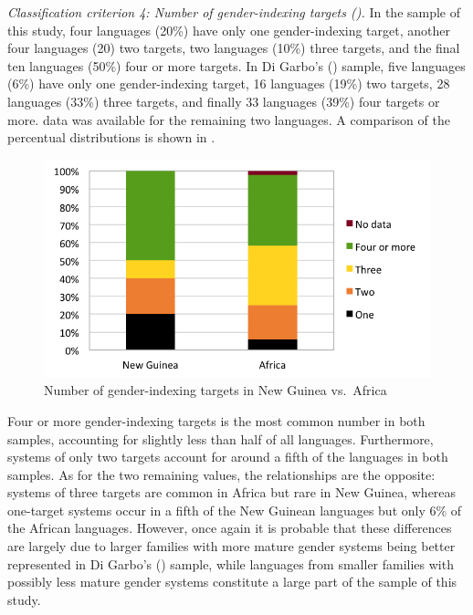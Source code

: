 \documentclass[output=collectionpaper]{langsci/langscibook}
\begin{document}
\textit{Classification criterion 4: Number of gender-indexing targets ().} In the sample of this study, four languages (20\%) have only one gender-indexing target, another four languages (20) two targets, two languages (10\%) three targets, and the final ten languages (50\%) four or more targets. In Di Garbo's (\citealt*[68]{DiGarbo2014}) sample, five languages (6\%) have only one gender-indexing target, 16 languages (19\%) two targets, 28 languages (33\%) three targets, and finally 33 languages (39\%) four targets or more.  data was available for the remaining two languages. A comparison of the percentual distributions is shown in .


\begin{figure}
\includegraphics[width=\textwidth]{figures/09/fig10.png}
\caption{Number of gender-indexing targets in New Guinea vs.\ Africa}
\label{fig:Svard:10}
\end{figure}

Four or more gender-indexing targets is the most common number in both samples, accounting for slightly less than half of all languages. Furthermore, systems of only two targets account for around a fifth of the languages in both samples. As for the two remaining values, the relationships are the opposite: systems of three targets are common in Africa but rare in New Guinea, whereas one-target systems occur in a fifth of the New Guinean languages but only 6\% of the African languages. However, once again it is probable that these differences are largely due to larger families with more mature gender systems being better represented in Di Garbo's (\citealt*{DiGarbo2014}) sample, while languages from smaller families with possibly less mature gender systems constitute a large part of the sample of this study.
\end{document}
